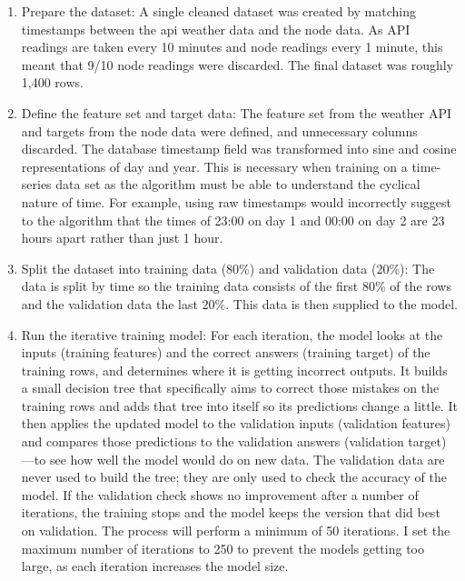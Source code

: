 \begin{enumerate}
    \item Prepare the dataset: A single cleaned dataset was created by matching
          timestamps between the api weather data and the node data. As API
          readings are taken every 10 minutes and node readings every 1 minute,
          this meant that 9/10 node readings were discarded. The final dataset
          was roughly 1,400 rows.
    \item Define the feature set and target data: The feature set from the
          weather API and targets from the node data were defined, and
          unnecessary columns discarded. The database timestamp field was
          transformed into sine and cosine representations of day and year. This
          is necessary when training on a time-series data set as the algorithm
          must be able to understand the cyclical nature of time. For example,
          using raw timestamps would incorrectly suggest to the algorithm that
          the times of 23:00 on day 1 and 00:00 on day 2 are 23 hours apart
          rather than just 1 hour.
    \item Split the dataset into training data (80\%) and validation data
          (20\%): The data is split by time so the training data consists of the
          first 80\% of the rows and the validation data the last 20\%.  This
          data is then supplied to the model.
    \item Run the iterative training model: For each iteration, the model looks
          at the inputs (training features) and the correct answers (training
          target) of the training rows, and determines where it is getting
          incorrect outputs. It builds a small decision tree that specifically
          aims to correct those mistakes on the training rows and adds that tree
          into itself so its predictions change a little. It then applies the
          updated model to the validation inputs (validation features) and
          compares those predictions to the validation answers (validation
          target) —to see how well the model would do on new data. The
          validation data are never used to build the tree; they are only used
          to check the accuracy of the model. If the validation check shows no
          improvement after a number of iterations, the training stops and the
          model keeps the version that did best on validation.  The process will
          perform a minimum of 50 iterations. I set the maximum number of
          iterations to 250 to prevent the models getting too large, as each
          iteration increases the model size.
\end{enumerate}


